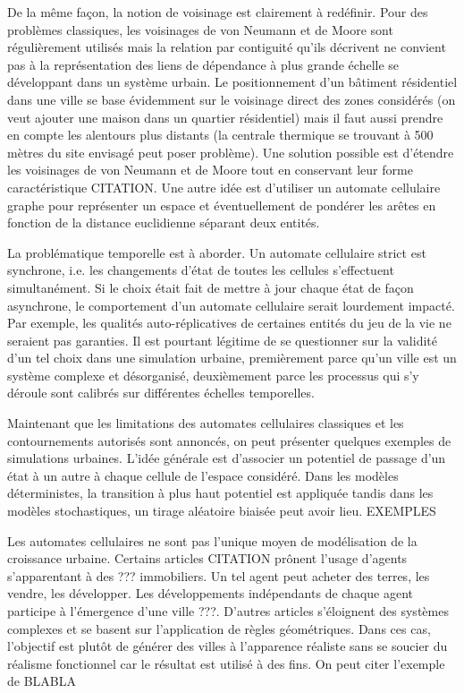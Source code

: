 \documentclass[10pt]{article}
\begin{document}
\begin{multicols}{2}
De la même façon, la notion de voisinage est clairement à
redéfinir. Pour des problèmes classiques, les voisinages de von
Neumann et de Moore sont régulièrement utilisés mais la relation par
contiguité qu'ils décrivent ne convient pas à la représentation des
liens de dépendance à plus grande échelle se développant dans un
système urbain. Le positionnement d'un bâtiment résidentiel dans une
ville se base évidemment sur le voisinage direct des zones considérés
(on veut ajouter une maison dans un quartier résidentiel) mais il faut
aussi prendre en compte les alentours plus distants (la centrale
thermique se trouvant à 500 mètres du site envisagé peut poser
problème). Une solution possible est d'étendre les voisinages de von
Neumann et de Moore tout en conservant leur forme caractéristique
CITATION. Une autre idée est d'utiliser un automate cellulaire graphe
pour représenter un espace \cite{0'Sullivan2001} et éventuellement de
pondérer les arêtes en fonction de la distance euclidienne séparant
deux entités.

La problématique temporelle est à aborder. Un automate cellulaire
strict est synchrone, i.e. les changements d'état de toutes les
cellules s'effectuent simultanément. Si le choix était fait de mettre
à jour chaque état de façon asynchrone, le comportement d'un automate
cellulaire serait lourdement impacté. Par exemple, les qualités
auto-réplicatives de certaines entités du jeu de la vie ne seraient
pas garanties. Il est pourtant légitime de se questionner sur la
validité d'un tel choix dans une simulation urbaine, premièrement
parce qu'un ville est un système complexe et désorganisé, deuxièmement
parce les processus qui s'y déroule sont calibrés sur différentes
échelles temporelles.

Maintenant que les limitations des automates cellulaires classiques et
les contournements autorisés sont annoncés, on peut présenter quelques
exemples de simulations urbaines. L'idée générale est d'associer un
potentiel de passage d'un état à un autre à chaque cellule de l'espace
considéré. Dans les modèles déterministes, la transition à plus haut
potentiel est appliquée tandis dans les modèles stochastiques, un
tirage aléatoire biaisée peut avoir lieu. EXEMPLES

Les automates cellulaires ne sont pas l'unique moyen de modélisation
de la croissance urbaine. Certains articles CITATION prônent l'usage
d'agents s'apparentant à des ??? immobiliers. Un tel agent peut
acheter des terres, les vendre, les développer. Les développements
indépendants de chaque agent participe à l'émergence d'une ville
???. D'autres articles s'éloignent des systèmes complexes et se basent
sur l'application de règles géométriques. Dans ces cas, l'objectif est
plutôt de générer des villes à l'apparence réaliste sans se soucier du
réalisme fonctionnel car le résultat est utilisé à des fins. On peut
citer l'exemple de BLABLA


\end{multicols}
\end{document}
